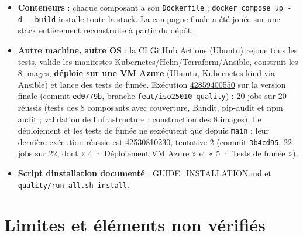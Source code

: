 \documentclass[
  11pt,
]{article}
\providecommand{\tightlist}{%
  \setlength{\itemsep}{0pt}\setlength{\parskip}{0pt}}
\begin{document}
\begin{itemize}
\tightlist
\item
  \textbf{Conteneurs} : chaque composant a son \texttt{Dockerfile} ;
  \texttt{docker\ compose\ up\ -}\allowbreak{}\texttt{d\ -}\allowbreak{}\texttt{-}\allowbreak{}\texttt{build}
  installe toute la stack. La campagne finale a été jouée sur une stack
  entièrement reconstruite à partir du dépôt.
\item
  \textbf{Autre machine, autre OS} : la CI GitHub Actions (Ubuntu)
  rejoue tous les tests, valide les manifestes
  Kubernetes/Helm/Terraform/Ansible, construit les 8 images,
  \textbf{déploie sur une VM Azure} (Ubuntu, Kubernetes kind via
  Ansible) et lance des tests de fumée. Exécution
  \href{https://github.com/omartitouhi/SmartRecruit/actions/runs/42859400550}{42859400550}
  sur la version finale (commit \texttt{ed0779b}, branche
  \texttt{feat/}\allowbreak{}\texttt{iso25010-}\allowbreak{}\texttt{quality})
  : 20 jobs sur 20 réussis (tests des 8 composants avec couverture,
  Bandit, pip-audit et npm audit ; validation de
  l\textquotesingle infrastructure ; construction des 8 images). Le
  déploiement et les tests de fumée ne s\textquotesingle exécutent que
  depuis \texttt{main} : leur dernière exécution réussie est
  \href{https://github.com/omartitouhi/SmartRecruit/actions/runs/42530810230/attempts/2}{42530810230,
  tentative 2} (commit \texttt{3b4cd95}, 22 jobs sur 22, dont « 4 ·
  Déploiement VM Azure » et « 5 · Tests de fumée »).
\item
  \textbf{Script d\textquotesingle installation documenté} :
  \href{GUIDE_INSTALLATION.pdf}{GUIDE\_INSTALLATION.md} et
  \texttt{quality/}\allowbreak{}\texttt{run-}\allowbreak{}\texttt{all.}\allowbreak{}\texttt{sh\ install}.
\end{itemize}

\section{Limites et éléments non
vérifiés}\label{limites-et-uxe9luxe9ments-non-vuxe9rifiuxe9s}
\end{document}
